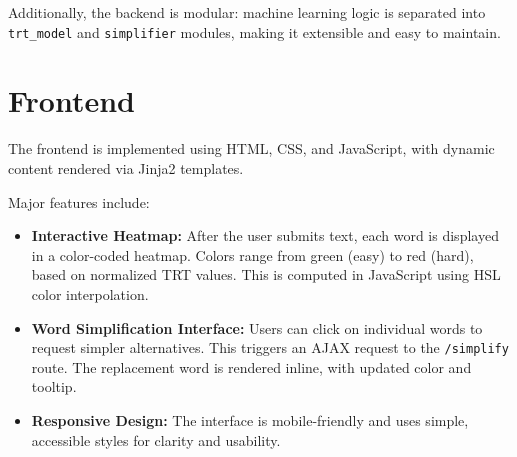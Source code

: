 Additionally, the backend is modular: machine learning logic is separated into \texttt{trt\_model} and \texttt{simplifier} modules, making it extensible and easy to maintain.

\section{Frontend}
The frontend is implemented using HTML, CSS, and JavaScript, with dynamic content rendered via Jinja2 templates.

Major features include:
\begin{itemize}
    \item \textbf{Interactive Heatmap:} After the user submits text, each word is displayed in a color-coded heatmap. Colors range from green (easy) to red (hard), based on normalized TRT values. This is computed in JavaScript using HSL color interpolation.

    \item \textbf{Word Simplification Interface:} Users can click on individual words to request simpler alternatives. This triggers an AJAX request to the \texttt{/simplify} route. The replacement word is rendered inline, with updated color and tooltip.
    
    \item \textbf{Responsive Design:} The interface is mobile-friendly and uses simple, accessible styles for clarity and usability.
\end{itemize}